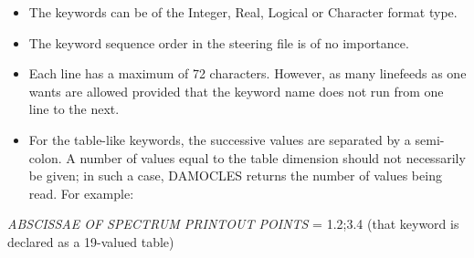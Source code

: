 \begin{itemize}
\item  The keywords can be of the Integer, Real, Logical or Character format type.

\item  The keyword sequence order in the steering file is of no importance.

\item  Each line has a maximum of 72 characters. However, as many linefeeds as one wants
  are allowed provided that the keyword name does not run from one line to the next.

\item  For the table-like keywords, the successive values are separated by a semi-colon.
  A number of values equal to the table dimension should not necessarily be given; in
  such a case, DAMOCLES returns the number of values being read. For example:
\end{itemize}

\textit{ABSCISSAE OF SPECTRUM PRINTOUT POINTS }= 1.2;3.4   (that keyword is declared
as a 19-valued table)

